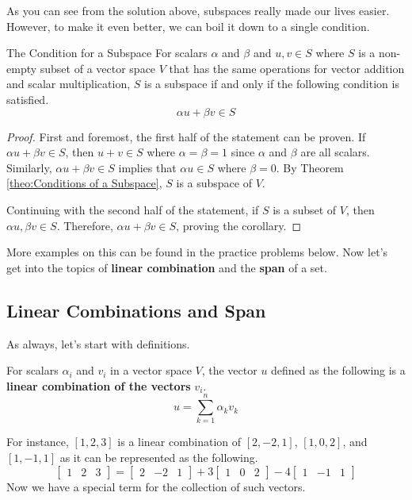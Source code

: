 \documentclass[../main.tex]{subfiles}
\begin{document}
As you can see from the solution above, subspaces really made our
lives easier. However, to make it even better, we can boil it down
to a single condition.

\begin{corollary}{The Condition for a Subspace}
For scalars $\alpha$ and $\beta$ and $u, v \in S$ where $S$ is a
non-empty subset of a vector space $V$ that has the same operations
for vector addition and scalar multiplication, $S$ is a subspace if
and only if the following condition is satisfied.
\[
\alpha u + \beta v \in S
\]
\end{corollary}
\begin{proof}
First and foremost, the first half of the statement can be proven.
If $\alpha u + \beta v \in S$, then $u + v \in S$ where $\alpha =
\beta = 1$ since $\alpha$ and $\beta$ are all scalars. Similarly,
$\alpha u + \beta v \in S$ implies that $\alpha u \in S$ where
$\beta = 0$. By Theorem \ref{theo:Conditions of a Subspace}, $S$ is a
subspace of $V$.

Continuing with the second half of the statement, if $S$ is a subset
of $V$, then $\alpha u, \beta v \in S$. Therefore, $\alpha u +
\beta v \in S$, proving the corollary.
\end{proof}

More examples on this can be found in the practice problems below.
Now let's get into the topics of \textbf{linear combination} and the
\textbf{span} of a set.

\subsection{Linear Combinations and Span}

As always, let's start with definitions.

\begin{definition}
For scalars $\alpha_i$ and $v_i$ in a vector space $V$, the vector
$u$ defined as the following is a \textbf{linear combination of the
vectors} $v_i$.
\[
u = \sum_{k = 1}^n \alpha_k v_k
\]
\end{definition}

For instance, $[1, 2, 3]$ is a linear combination of $[2, -2, 1]$,
$[1, 0, 2]$, and $[1, -1, 1]$ as it can be represented as the
following.
\[
\begin{bmatrix}
    1 & 2 & 3
\end{bmatrix}
=
\begin{bmatrix}
    2 & -2 & 1
\end{bmatrix}
+
3\begin{bmatrix}
    1 & 0 & 2
\end{bmatrix}
-
4\begin{bmatrix}
    1 & -1 & 1
\end{bmatrix}
\]
Now we have a special term for the collection of such vectors.
\end{document}

